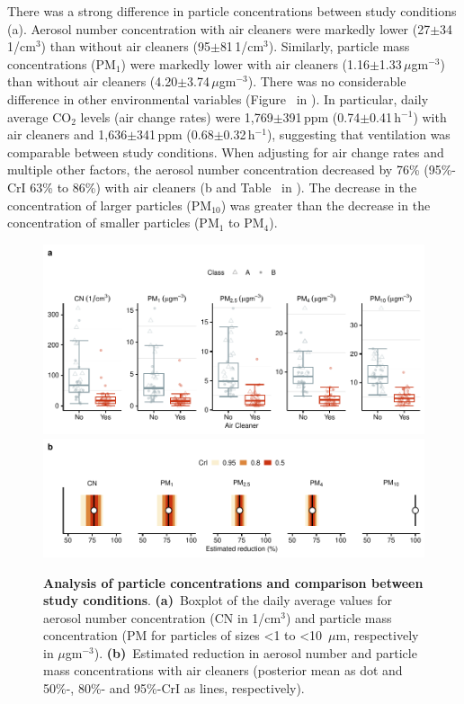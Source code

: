 \documentclass[fleqn,11pt]{wlscirep}
\begin{document}
There was a strong difference in particle concentrations between study conditions (a). Aerosol number concentration with air cleaners were markedly lower (27$\pm$34\,1/cm$^3$) than without air cleaners (95$\pm$81\,1/cm$^3$). Similarly, particle mass concentrations (\eg PM$_1$) were markedly lower with air cleaners (1.16$\pm$1.33\,$\mu$gm$^{-3}$) than without air cleaners (4.20$\pm$3.74\,$\mu$gm$^{-3}$). There was no considerable difference in other environmental variables (Figure~ in \supp). In particular, daily average CO$_2$ levels (air change rates) were 1,769$\pm$391\,ppm (0.74$\pm$0.41\,h$^{-1}$) with air cleaners and 1,636$\pm$341\,ppm (0.68$\pm$0.32\,h$^{-1}$), suggesting that ventilation was comparable between study conditions. When adjusting for air change rates and multiple other factors, the aerosol number concentration decreased by 76\% (95\%-CrI 63\% to 86\%) with air cleaners (b and Table~ in \supp). The decrease in the concentration of larger particles (PM$_{10}$) was greater than the decrease in the concentration of smaller particles (PM$_1$ to PM$_{4}$). 

\begin{figure}[!htpb]
\centering
    \includegraphics[width=\linewidth]{../../results/env-data/particles-boxplot.pdf}
    \includegraphics[width=\linewidth]{../../results/env-data/estimation-results-figure.pdf}
    \caption{\textbf{Analysis of particle concentrations and comparison between study conditions}. \textbf{(a)}~Boxplot of the daily average values for aerosol number concentration (CN in 1/cm$^3$) and particle mass concentration (PM for particles of sizes <1 to <10~$\mu$m, respectively in $\mu$gm$^{-3}$). \textbf{(b)}~Estimated reduction in aerosol number and particle mass concentrations with air cleaners (posterior mean as dot and 50\%-, 80\%- and 95\%-CrI as lines, respectively). }
    \label{fig:palas-results}
\end{figure}
\end{document}
